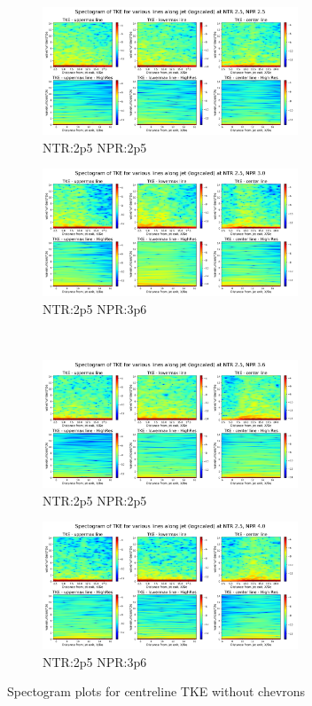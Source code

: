 \begin{figure}[H]
\begin{subfigure}{0.5\textwidth}
	\centering
	\includegraphics[width=3in]{images/Spectogram_TKE_NTR2p5_NPR2p5.png}
	\caption{NTR:2p5 NPR:2p5 }
	\label{fig:spectogramTKE2p52p5}
\end{subfigure}%
\begin{subfigure}{0.5\textwidth}
	\centering
	\includegraphics[width=3in]{images/Spectogram_TKE_NTR2p5_NPR3p0.png}
	\caption{NTR:2p5 NPR:3p6 }
	\label{fig:spectogramTKE2p53p0}
\end{subfigure}\\
\begin{subfigure}{0.5\textwidth}
	\centering
	\includegraphics[width=3in]{images/Spectogram_TKE_NTR2p5_NPR3p6.png}
	\caption{NTR:2p5 NPR:2p5 }
	\label{fig:spectogramTKE2p53p6}
\end{subfigure}%
\begin{subfigure}{0.5\textwidth}
	\centering
	\includegraphics[width=3in]{images/Spectogram_TKE_NTR2p5_NPR4p0.png}
	\caption{NTR:2p5 NPR:3p6 }
	\label{fig:spectogramTKE2p54p0}
\end{subfigure}
\caption{Spectogram plots for centreline TKE without chevrons }
\label{fig:spectogramTKE}
\end{figure} 


